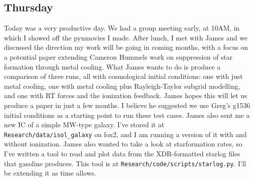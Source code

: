\documentclass[11pt,letterpaper]{article}
\begin{document}
\subsection*{Thursday}
Today was a very productive day.  We had a group meeting early, at 10AM, in
which I showed off the pynmovies I made.  After lunch, I met with James and
we discussed the direction my work will be going in coming months, with a focus
on a potential paper extending Cameron Hummels work on suppression of star 
formation through metal cooling.  What James wants to do is produce a comparison
of three runs, all with cosmological initial conditions: one with just metal
cooling, one with metal cooling plus Rayleigh-Taylor subgrid modelling, and one
with RT forces and the ionization feedback.  James hopes this will let us 
produce a paper in just a few months.  I believe he suggested we use Greg's 
g1536 initial conditions as a starting point to run these test cases.  James
also sent me a new IC of a simple MW-type galaxy.  I've stored it at 
\verb!Research/data/isol_galaxy! on fox2, and I am running a version of it
with and without ionization.  James also wanted to take a look at starformation
rates, so I've written a tool to read and plot data from the XDR-formatted 
starlog files that gasoline produces.  This tool is at 
\verb!Research/code/scripts/starlog.py!.  I'll be extending it as time allows.
\end{document}

